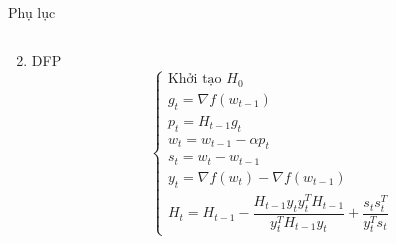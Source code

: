 \documentclass[10pt]{beamer}
\theoremstyle{remark}
\theoremstyle{definition}
\begin{document}
\begin{frame}[allowframebreaks]{Phụ lục}
\begin{enumerate}
\begin{equation*}
		\end{equation*}
		\framebreak
		\item DFP
		\begin{equation*}
			\begin{cases} \text{Khởi tạo } H_0 \\
			g_t = \nabla f(w_{t-1}) \\
			p_t = H_{t-1} g_t \\
			w_t = w_{t-1} - \alpha p_t \\
			s_t = w_t - w_{t-1} \\
			y_t = \nabla f(w_t) - \nabla f(w_{t-1}) \\
			H_t = H_{t-1} - \dfrac{H_{t-1}y_t y_t^T H_{t-1}}{y_t^T H_{t-1} y_t} + \dfrac{s_t s_t^T}{y_t^T s_t}\end{cases}
		\end{equation*}
	\end{enumerate}
\end{frame}
\end{document}

